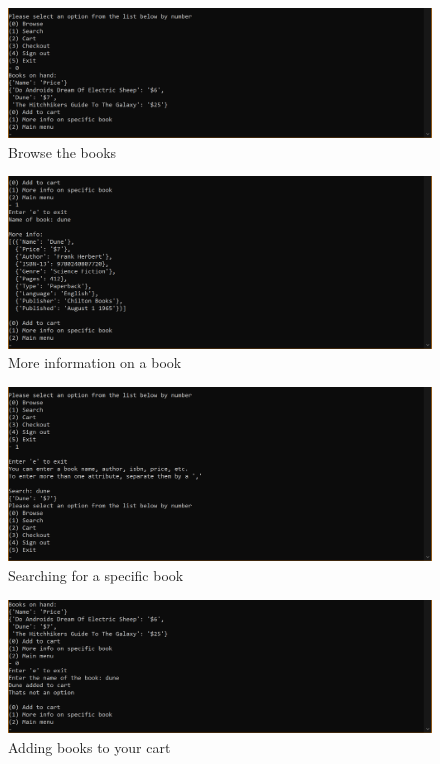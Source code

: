 \documentclass[a4 paper]{article}
\begin{document}
\begin{figure}
\centering 
\includegraphics[width=\textwidth/1]{scenarios_cmd/browse_menu.png}
\caption{Browse the books}
\end{figure}
\begin{figure}
\centering 
\includegraphics[width=\textwidth/1]{scenarios_cmd/more_info.png}
\caption{More information on a book}
\end{figure}
\begin{figure}
\centering 
\includegraphics[width=\textwidth/1]{scenarios_cmd/search.png}
\caption{Searching for a specific book}
\end{figure}
\begin{figure}
\centering 
\includegraphics[width=\textwidth/1]{scenarios_cmd/adding_to_cart.png}
\caption{Adding books to your cart}
\end{figure}
\end{document}
